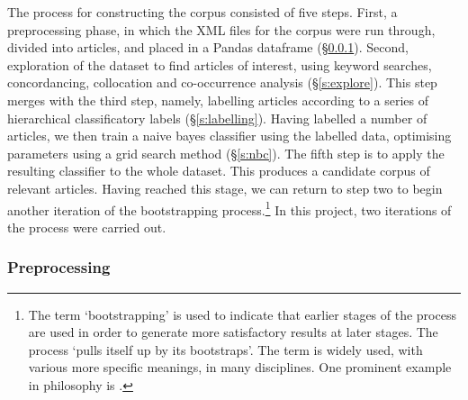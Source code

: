 \documentclass{article}
\begin{document}
The process for constructing the corpus consisted of five steps. First, a preprocessing phase, in which the XML files for the corpus were run through, divided into articles, and placed in a Pandas dataframe (\S \ref{s:preprop}). Second, exploration of the dataset to find articles of interest, using keyword searches, concordancing, collocation and co-occurrence analysis (\S \ref{s:explore}). This step merges with the third step, namely, labelling articles according to a series of hierarchical classificatory labels (\S \ref{s:labelling}). Having labelled a number of articles, we then train a naive bayes classifier using the labelled data, optimising parameters using a grid search method (\S \ref{s:nbc}). The fifth step is to apply the resulting classifier to the whole dataset. This produces a candidate corpus of relevant articles. Having reached this stage, we can return to step two to begin another iteration of the bootstrapping process.\footnote{
The term `bootstrapping' is used to indicate that earlier stages of the process are used in order to generate more satisfactory results at later stages. The process `pulls itself up by its bootstraps'. The term is widely used, with various more specific meanings, in many disciplines. One prominent example in philosophy is \cite{glymour}.
}
In this project, two iterations of the process were carried out.

\subsubsection{Preprocessing}\label{s:preprop}
\end{document}
